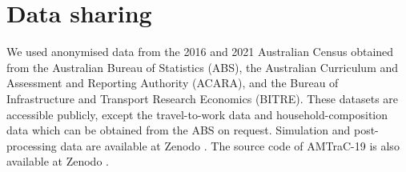 \documentclass{article}
\begin{document}
\section*{Data sharing}
We used anonymised data from the 2016 and 2021 Australian Census obtained from the Australian Bureau of Statistics (ABS), the Australian Curriculum and Assessment and Reporting Authority (ACARA), and the Bureau of Infrastructure and Transport Research Economics (BITRE). These datasets are accessible publicly, except the travel-to-work data and household-composition data which can be obtained from the ABS on request. 
Simulation  and post-processing data are available at Zenodo \cite{AMTrac_dataset}. The source code of AMTraC-19 is also available at Zenodo \cite{chang_amtract_user_guide_2022_7325675}.

\end{document}
